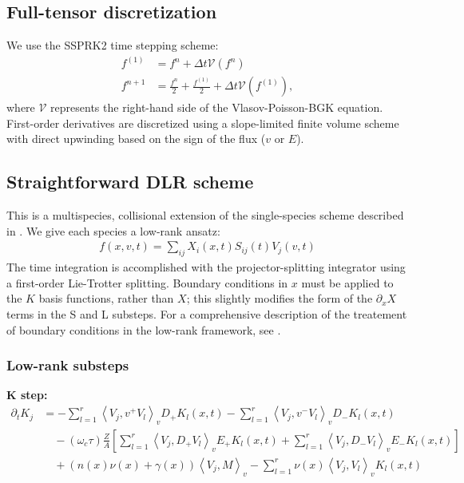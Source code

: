 \documentclass{article}
\begin{document}
\subsection{Full-tensor discretization}

We use the SSPRK2 time stepping scheme:
\begin{align*}
    f^{(1)} &= f^n + \Delta t \mathcal{V}(f^n) \\
    f^{n+1} &= \frac{f^n}{2} + \frac{f^{(1)}}{2} + \Delta t \mathcal{V}(f^{(1)}),
\end{align*}
where $\mathcal{V}$ represents the right-hand side of the Vlasov-Poisson-BGK equation.
First-order derivatives are discretized using a slope-limited finite volume scheme with direct upwinding based on the
sign of the flux ($v$ or $E$).

\subsection{Straightforward DLR scheme}

This is a multispecies, collisional extension of the single-species scheme described in
\cite{einkemmerLowRankProjectorSplittingIntegrator2018}.
We give each species a low-rank ansatz:
\begin{align*}
    f(x, v, t) = \sum_{ij} X_i(x, t) S_{ij}(t) V_j(v, t)
\end{align*}
The time integration is accomplished with the projector-splitting integrator using a first-order
Lie-Trotter splitting.
Boundary conditions in $x$ must be applied to the $K$ basis functions, rather than $X$; this slightly modifies
the form of the $\partial_x X$ terms in the S and L substeps. For a comprehensive description of the treatement
of boundary conditions in the low-rank framework, see \cite{huAdaptiveDynamicalLow2022}.

\subsubsection{Low-rank substeps}

\textbf{K step:}
\begin{align*}
    \partial_t K_j &= -\sum_{l=1}^r \left\langle V_j, v^+ V_l \right\rangle_v D_+ K_l(x, t) - \sum_{l=1}^r \left\langle V_j, v^- V_l \right\rangle_v D_- K_l(x, t)  \\
                         &\quad - (\omega_c \tau) \frac{Z}{A} \left[ \sum_{l=1}^r \left\langle V_j, D_+ V_l \right\rangle_v E_+ K_l(x, t) + \sum_{l=1}^r \left\langle V_j, D_- V_l \right\rangle_v E_- K_l(x, t) \right] \\
                         &\quad + (n(x) \nu(x) + \gamma(x)) \left\langle V_j, M \right\rangle_v - \sum_{l=1}^r \nu(x)  \left\langle V_j, V_l \right\rangle_v K_l(x, t)
\end{align*}
\end{document}
